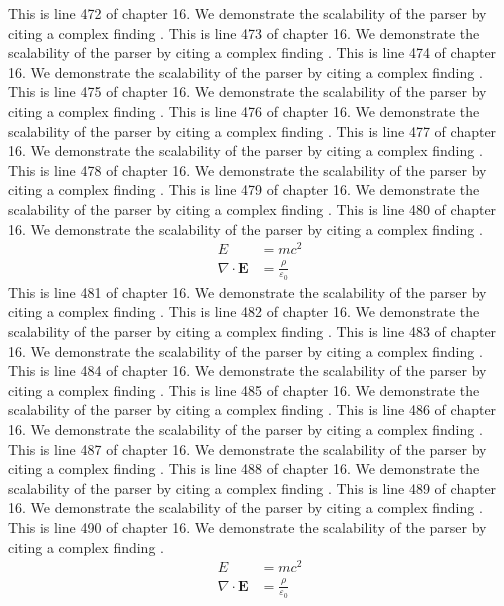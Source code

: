 This is line 472 of chapter 16. We demonstrate the scalability of the parser by citing a complex finding \cite{ref16_472}.
This is line 473 of chapter 16. We demonstrate the scalability of the parser by citing a complex finding \cite{ref16_473}.
This is line 474 of chapter 16. We demonstrate the scalability of the parser by citing a complex finding \cite{ref16_474}.
This is line 475 of chapter 16. We demonstrate the scalability of the parser by citing a complex finding \cite{ref16_475}.
This is line 476 of chapter 16. We demonstrate the scalability of the parser by citing a complex finding \cite{ref16_476}.
This is line 477 of chapter 16. We demonstrate the scalability of the parser by citing a complex finding \cite{ref16_477}.
This is line 478 of chapter 16. We demonstrate the scalability of the parser by citing a complex finding \cite{ref16_478}.
This is line 479 of chapter 16. We demonstrate the scalability of the parser by citing a complex finding \cite{ref16_479}.
This is line 480 of chapter 16. We demonstrate the scalability of the parser by citing a complex finding \cite{ref16_480}.
\begin{align*}
  E &= mc^2 \\
  \nabla \cdot \mathbf{E} &= \frac{\rho}{\varepsilon_0}
\end{align*}
This is line 481 of chapter 16. We demonstrate the scalability of the parser by citing a complex finding \cite{ref16_481}.
This is line 482 of chapter 16. We demonstrate the scalability of the parser by citing a complex finding \cite{ref16_482}.
This is line 483 of chapter 16. We demonstrate the scalability of the parser by citing a complex finding \cite{ref16_483}.
This is line 484 of chapter 16. We demonstrate the scalability of the parser by citing a complex finding \cite{ref16_484}.
This is line 485 of chapter 16. We demonstrate the scalability of the parser by citing a complex finding \cite{ref16_485}.
This is line 486 of chapter 16. We demonstrate the scalability of the parser by citing a complex finding \cite{ref16_486}.
This is line 487 of chapter 16. We demonstrate the scalability of the parser by citing a complex finding \cite{ref16_487}.
This is line 488 of chapter 16. We demonstrate the scalability of the parser by citing a complex finding \cite{ref16_488}.
This is line 489 of chapter 16. We demonstrate the scalability of the parser by citing a complex finding \cite{ref16_489}.
This is line 490 of chapter 16. We demonstrate the scalability of the parser by citing a complex finding \cite{ref16_490}.
\begin{align*}
  E &= mc^2 \\
  \nabla \cdot \mathbf{E} &= \frac{\rho}{\varepsilon_0}
\end{align*}
